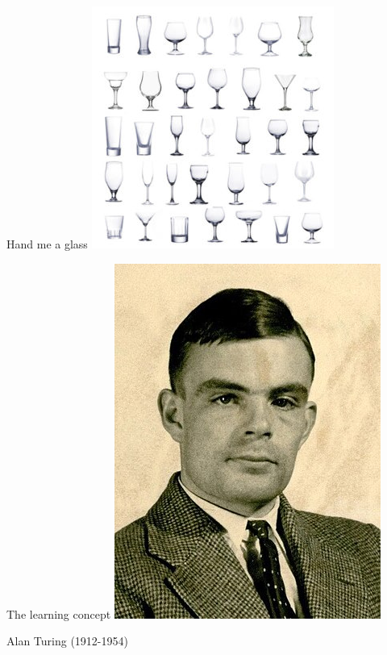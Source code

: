 \documentclass{beamer}
\begin{document}
\begin{frame}{Hand me a glass}
\centering
\includegraphics[scale=0.7]{pics/glasses.jpg}
\end{frame}

\begin{frame}{The learning concept}
\centering
\includegraphics[scale=0.4]{pics/turing.jpg}

Alan Turing (1912-1954)
\end{frame}
\end{document}
